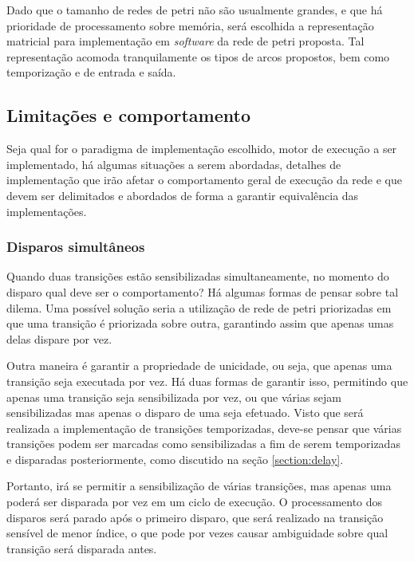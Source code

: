 Dado que o tamanho de redes de petri não são usualmente grandes, e que há prioridade de processamento sobre memória, será escolhida a representação matricial para implementação em \textit{software} da rede de petri proposta. Tal representação acomoda tranquilamente os tipos de arcos propostos, bem como temporização e de entrada e saída.



\subsection{Limitações e comportamento}
\label{section:limitations}

Seja qual for o paradigma de implementação escolhido, motor de execução a ser implementado, há algumas situações a serem abordadas, detalhes de implementação que irão afetar o comportamento geral de execução da rede e que devem ser delimitados e abordados de forma a garantir equivalência das implementações.

\subsubsection{Disparos simultâneos}

Quando duas transições estão sensibilizadas simultaneamente, no momento do disparo qual deve ser o comportamento? Há algumas formas de pensar sobre tal dilema. Uma possível solução seria a utilização de rede de petri priorizadas em que uma transição é priorizada sobre outra, garantindo assim que apenas umas delas dispare por vez.

Outra maneira é garantir a propriedade de unicidade, ou seja, que apenas uma transição seja executada por vez. Há duas formas de garantir isso, permitindo que apenas uma transição seja sensibilizada por vez, ou que várias sejam sensibilizadas mas apenas o disparo de uma seja efetuado. Visto que será realizada a implementação de transições temporizadas, deve-se pensar que várias transições podem ser marcadas como sensibilizadas a fim de serem temporizadas e disparadas posteriormente, como discutido na seção \ref{section:delay}. 

Portanto, irá se permitir a sensibilização de várias transições, mas apenas uma poderá ser disparada por vez em um ciclo de execução. O processamento dos disparos será parado após o primeiro disparo, que será realizado na transição sensível de menor índice, o que pode por vezes causar ambiguidade sobre qual transição será disparada antes.

